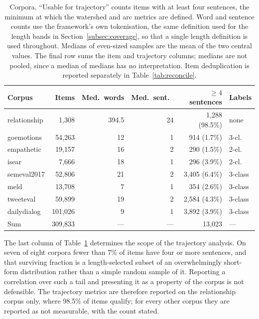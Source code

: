 \documentclass[fleqn,10pt]{wlscirep}
\providecommand{\botrule}{\bottomrule}
\begin{document}
\begin{table}[ht]
\centering
\small
\caption{Corpora. ``Usable for trajectory'' counts items with at least four sentences, the minimum at which the watershed and arc metrics are defined. Word and sentence counts use the framework's own tokenisation, the same definition used for the length bands in Section~\ref{subsec:coverage}, so that a single length definition is used throughout. Medians of even-sized samples are the mean of the two central values. The final row sums the item and trajectory columns; medians are not pooled, since a median of medians has no interpretation. Item deduplication is reported separately in Table~\ref{tab:reconcile}.}
\label{tab:corpora}
\begin{tabular}{lrrrrl}
\toprule
Corpus & Items & Med.\ words & Med.\ sent.\ & $\ge 4$ sentences & Labels \\
\midrule
relationship   & 1{,}308   & 394.5 & 24 & 1{,}288 (98.5\%) & none \\
goemotions     & 54{,}263  & 12  & 1  & 914 (1.7\%)      & 3-cl. \\
empathetic     & 19{,}157  & 16  & 2  & 290 (1.5\%)      & 2-cl. \\
isear          & 7{,}666   & 18  & 1  & 296 (3.9\%)      & 2-cl. \\
semeval2017    & 52{,}806  & 21  & 2  & 3{,}405 (6.4\%)  & 3-class \\
meld           & 13{,}708  & 7   & 1  & 354 (2.6\%)      & 3-class \\
tweeteval      & 59{,}899  & 19  & 2  & 2{,}584 (4.3\%)  & 3-class \\
dailydialog    & 101{,}026 & 9   & 1  & 3{,}892 (3.9\%)  & 3-class \\
\midrule
\midrule
Sum            & 309{,}833 & --- & --- & 13{,}023          & --- \\
\botrule
\end{tabular}
\end{table}

The last column of Table~\ref{tab:corpora} determines the scope of the trajectory analysis. On seven of eight corpora fewer than 7\% of items have four or more sentences, and that surviving fraction is a length-selected subset of an overwhelmingly short-form distribution rather than a simple random sample of it. Reporting a correlation over such a tail and presenting it as a property of the corpus is not defensible. The trajectory metrics are therefore reported on the relationship corpus only, where 98.5\% of items qualify; for every other corpus they are reported as not measurable, with the count stated.
\end{document}
